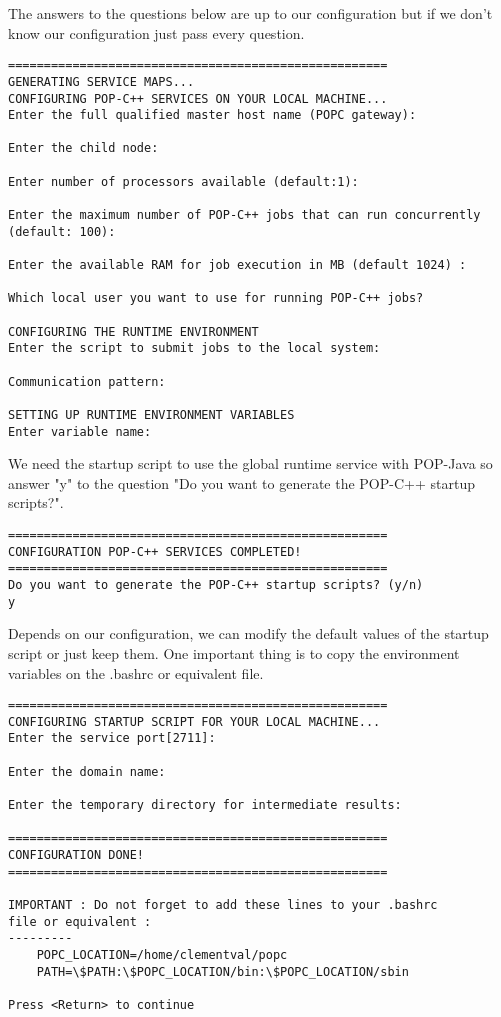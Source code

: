 \pagebreak
The answers to the questions below are up to our configuration but if we don't know our configuration just pass every question.
\begin{lstlisting}
=====================================================
GENERATING SERVICE MAPS...
CONFIGURING POP-C++ SERVICES ON YOUR LOCAL MACHINE...
Enter the full qualified master host name (POPC gateway):

Enter the child node:

Enter number of processors available (default:1):

Enter the maximum number of POP-C++ jobs that can run concurrently 
(default: 100):

Enter the available RAM for job execution in MB (default 1024) :

Which local user you want to use for running POP-C++ jobs?

CONFIGURING THE RUNTIME ENVIRONMENT
Enter the script to submit jobs to the local system:

Communication pattern:

SETTING UP RUNTIME ENVIRONMENT VARIABLES
Enter variable name:

\end{lstlisting}\s

We need the startup script to use the global runtime service with POP-Java so answer "y" to the question "Do you want to generate the POP-C++ startup scripts?".
\begin{lstlisting}
=====================================================
CONFIGURATION POP-C++ SERVICES COMPLETED!
=====================================================
Do you want to generate the POP-C++ startup scripts? (y/n)
y
\end{lstlisting}\s

\pagebreak
Depends on our configuration, we can modify the default values of the startup script or just keep them. One important thing is to copy the environment variables on the .bashrc or equivalent file.
\begin{lstlisting}
=====================================================
CONFIGURING STARTUP SCRIPT FOR YOUR LOCAL MACHINE...
Enter the service port[2711]:

Enter the domain name:

Enter the temporary directory for intermediate results:

=====================================================
CONFIGURATION DONE!
=====================================================

IMPORTANT : Do not forget to add these lines to your .bashrc 
file or equivalent :
---------
    POPC_LOCATION=/home/clementval/popc
    PATH=\$PATH:\$POPC_LOCATION/bin:\$POPC_LOCATION/sbin

Press <Return> to continue
\end{lstlisting}\s



